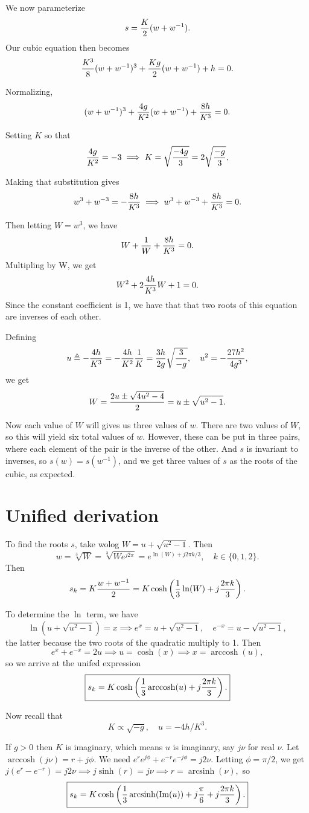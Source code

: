\documentclass[10pt]{article}
\newcommand{\im}{\text{Im}}
\DeclareMathOperator*{\arcsinh}{arcsinh}
\DeclareMathOperator*{\arccosh}{arccosh}
\begin{document}
We now parameterize $$ s = {K \over 2} (w + w^{-1}).$$ Our cubic  equation then becomes
$$ {K^3 \over 8} (w + w^{-1})^3 + {K g \over 2}(w + w^{-1}) + h = 0.$$

Normalizing,
$$ (w + w^{-1})^3 + {4 g \over K^2} (w + w^{-1}) + {8 h \over K^3} = 0.$$

Setting $K$ so that $$ {4 g \over K^2} = -3 \implies K = \sqrt {-4 g \over 3} = 2 \sqrt{-g \over 3},$$

Making that substitution gives $$ w^3 + w^{-3} = -{ 8 h \over K^3} \implies w^3 + w^{-3} + {8 h \over K^3} = 0.$$

Then letting $W = w^3$, we have $$ W + {1 \over W} + {8h \over K^3} = 0.$$
Multipling by W, we get $$ W^2 + 2 {4 h \over K^3} W + 1 =  0.$$ Since the constant coefficient is 1, we have that that two roots of this equation are inverses of each other.

Defining $$ u \triangleq -{4 h \over K^3} = -{4 h \over K^2}{1 \over K} = { 3 h \over 2 g} \sqrt{ 3 \over -g}, \quad u^2 = -{27 h^2 \over 4 g^3}, $$ we get  $$ W =  {2 u \pm \sqrt{4 u^2 - 4} \over 2} = u \pm \sqrt{u^2 -1}.$$

Now each value of $W$ will gives us three values of $w$. There are two values of $W$, so this will yield six total values of $w$. However, these can be put in three pairs, where each element of the pair is the inverse of the other. And $s$ is invariant to inverses, so $s(w) = s(w^{-1})$, and we get three values of $s$ as the roots of the cubic, as expected.
\section*{Unified derivation}
To find the roots $s$, take wolog $W = u + \sqrt{u^2 - 1}$.
Then $$w = \sqrt[3]{W} = \sqrt[3]{W e^{j 2\pi}}= e^{\ln(W) + j2\pi k/3},\quad k \in \{0,1,2\}.$$
Then $$s_k = K {w + w^{-1} \over 2} = K \cosh\left({1 \over 3} \ln(W)+ j { 2\pi k \over 3}\right).$$

To determine the $\ln$ term, we have $$ \ln(u + \sqrt{u^2 - 1}) = x \implies e^x = u + \sqrt{u^2 - 1}, \quad e^{-x} = u - \sqrt{u^2 - 1},$$ the latter because the two roots of the quadratic multiply to 1. Then $$e^x + e^{-x} = 2 u \implies u = \cosh(x) \implies x = \arccosh(u),$$ so we arrive at the unifed expression $$ \boxed{s_k = K \cosh\left({1 \over 3} \arccosh(u) + j {2\pi k \over 3}\right).}$$

Now recall that $$ K \propto \sqrt{-g}, \quad u = - {4 h /K^3}.$$

If $g > 0$ then $K$ is imaginary, which means $u$ is imaginary, say $j \nu$ for real $\nu$. Let $ \arccosh(j\nu) = r + j \phi.$ We need $e^r e^{j\phi} + e^{-r} e^{-j\phi} = j 2 \nu.$ Letting $\phi = \pi/2$, we get $j (e^r -  e^{-r}) = j 2 \nu \implies j \sinh(r) = j \nu \implies r = \arcsinh(\nu),$ so $$ \boxed{s_k = K \cosh\left({1 \over 3} \arcsinh(\im(u)) + j{\pi \over 6} + j{2\pi k \over 3}\right).}$$
\end{document}
